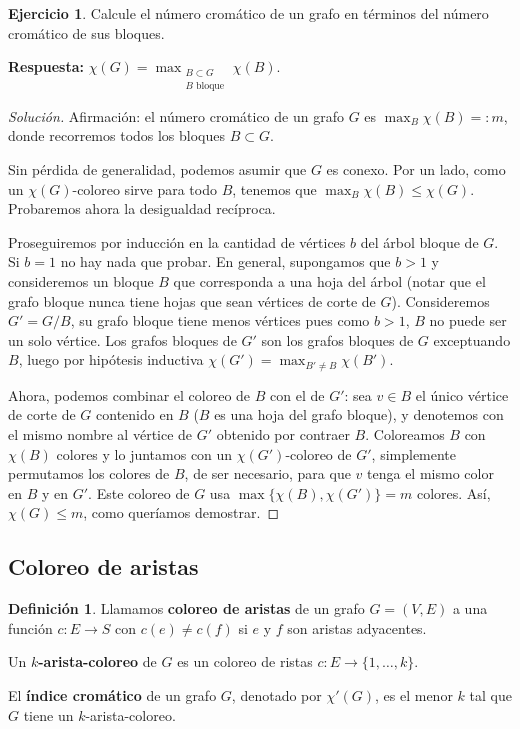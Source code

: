 \documentclass[12pt]{report}
\theoremstyle{plain}
\theoremstyle{definition}
\newtheorem{definition}[theorem]{Definición}
\newtheorem{exercise}[theorem]{Ejercicio}
\newenvironment{solution}{\begin{proof}[Solución]}{\end{proof}}
\begin{document}
\begin{exercise}
Calcule el número cromático de un grafo en términos del número cromático de sus bloques.

\textbf{Respuesta:} $\boxed{\chi (G) = \max_{\substack{B \subset G \\ \text{$B$ bloque}}} \chi (B).}$
\end{exercise}
\begin{solution}
Afirmación: el número cromático de un grafo $G$ es $\max_B \chi (B) =:m$, donde recorremos todos los bloques $B \subset G$.

Sin pérdida de generalidad, podemos asumir que $G$ es conexo. Por un lado, como un $\chi (G)$-coloreo sirve para todo $B$, tenemos que $\max_B \chi (B) \leq \chi (G)$. Probaremos ahora la desigualdad recíproca.

Proseguiremos por inducción en la cantidad de vértices $b$ del árbol bloque de $G$. Si $b = 1$ no hay nada que probar. En general, supongamos que $b > 1$ y consideremos un bloque $B$ que corresponda a una hoja del árbol (notar que el grafo bloque nunca tiene hojas que sean vértices de corte de $G$). Consideremos $G' = G/B$, su grafo bloque tiene menos vértices pues como $b > 1$, $B$ no puede ser un solo vértice. Los grafos bloques de $G'$ son los grafos bloques de $G$ exceptuando $B$, luego por hipótesis inductiva $\chi (G') = \max_{B' \neq B} \chi (B')$.

Ahora, podemos combinar el coloreo de $B$ con el de $G'$: sea $v \in B$ el único vértice de corte de $G$ contenido en $B$ ($B$ es una hoja del grafo bloque), y denotemos con el mismo nombre al vértice de $G'$ obtenido por contraer $B$. Coloreamos $B$ con $\chi (B)$ colores y lo juntamos con un $\chi (G')$-coloreo de $G'$, simplemente permutamos los colores de $B$, de ser necesario, para que $v$ tenga el mismo color en $B$ y en $G'$. Este coloreo de $G$ usa $\max \{ \chi (B), \chi (G') \} = m$ colores. Así, $\chi (G) \leq m$, como queríamos demostrar.
\end{solution}










\subsection{Coloreo de aristas}

\begin{definition}
Llamamos \textbf{coloreo de aristas} de un grafo $G = (V,E)$ a una función $c : E \rightarrow S$ con $c(e) \neq c(f)$ si $e$ y $f$ son aristas adyacentes.

Un \textbf{$k$-arista-coloreo} de $G$ es un coloreo de ristas $c : E \rightarrow \{1,\ldots,k\}$.

El \textbf{índice cromático} de un grafo $G$, denotado por $\chi' (G)$, es el menor $k$ tal que $G$ tiene un $k$-arista-coloreo.
\end{definition}
\end{document}
